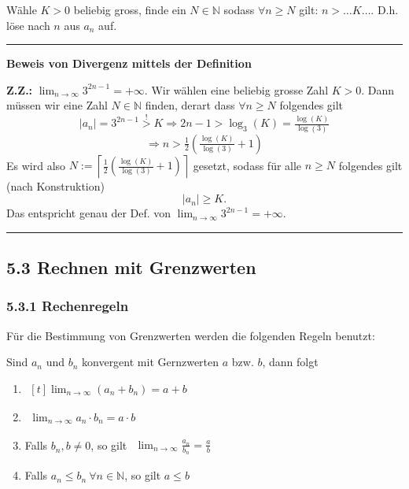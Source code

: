 \documentclass[a4paper,landscape,8pt]{extarticle}
\newcommand{\N}{\mathbb{N}}
\newcommand{\abs}[1]{\left\lvert #1 \right\rvert}
\newcommand{\ceil}[1]{\left\lceil #1 \right\rceil}
\newcommand{\sep}{\vspace{5pt}\noindent\hrule\vspace{5pt}}
\newcommand{\ZZ}{\textbf{Z.Z.: }}
\begin{document}
\begin{multicols*}{4}
Wähle $K>0$ beliebig gross, finde ein $N\in\N$ sodass $\forall n\geq N$ gilt:
$n>\ldots K \ldots$. D.h. löse nach $n$ aus $a_n$ auf.

\begin{warmup}
\sep

\textbf{Beweis von Divergenz mittels der Definition}

\Bsp \ZZ $\lim_{n\to\infty} 3^{2n-1}= + \infty$.
Wir wählen eine beliebig grosse Zahl $K>0$. Dann müssen wir eine Zahl $N\in\N$
finden, derart dass $\forall n\geq N$ folgendes gilt
\[
\abs{a_n}=3^{2n-1} \stackrel{!}{>} K
\Longrightarrow
2n-1 > \log_3(K) = \tfrac{\log(K)}{\log(3)}
\]
\[
\Longrightarrow n > \tfrac{1}{2}\left(\tfrac{\log(K)}{\log(3)}+1\right)
\]
Es wird also $N:=\ceil{\tfrac{1}{2}\left(\tfrac{\log(K)}{\log(3)}+1\right)}$
gesetzt, sodass für alle $n\geq N$ folgendes gilt (nach Konstruktion)
\[
\abs{a_n} \geq K.
\]
Das entspricht genau der Def. von $\lim_{n\to\infty} 3^{2n-1}= + \infty$.

\sep
\end{warmup}

\subsection{5.3 Rechnen mit Grenzwerten}

\subsubsection{5.3.1 Rechenregeln}

Für die Bestimmung von Grenzwerten werden die folgenden Regeln benutzt:

\Satz Sind $a_n$ und $b_n$ konvergent mit Gernzwerten $a$ bzw. $b$, dann folgt
\begin{enumerate}
  \item $\begin{aligned}[t]\lim_{n\to\infty}(a_n+b_n) = a + b\end{aligned}$
  \item $\begin{aligned}\lim_{n\to\infty}a_n\cdot b_n = a \cdot b\end{aligned}$
  \item Falls $b_n,b\neq 0$, so gilt
  $\begin{aligned}\lim_{n\to\infty}\frac{a_n}{b_n}=\frac{a}{b}\end{aligned}$
  \item Falls $a_n\leq b_n \ \forall n \in \N$, so gilt $a\leq b$
\end{enumerate}


\end{multicols*}
\end{document}
